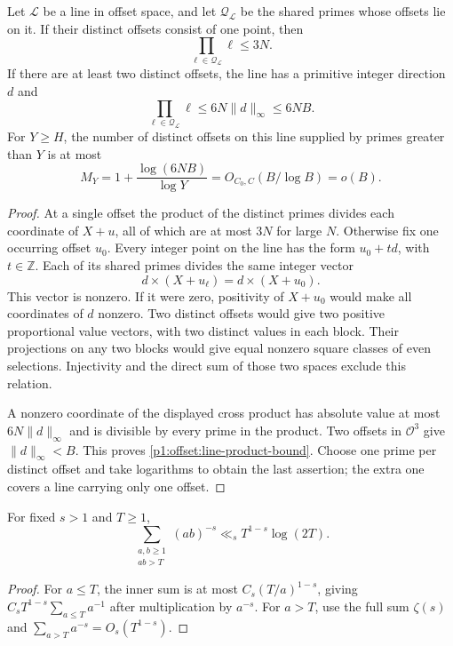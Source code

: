 \begin{lemma}
\label{p1:offset:line-product}
Let $\mathcal L$ be a line in offset space, and let
$\mathcal Q_{\mathcal L}$ be the shared primes whose offsets lie on it.
If their distinct offsets consist of one point, then
\[
 \prod_{\ell\in\mathcal Q_{\mathcal L}}\ell\le3N.
\]
If there are at least two distinct offsets, the line has a primitive
integer direction $d$ and
\begin{equation}
 \prod_{\ell\in\mathcal Q_{\mathcal L}}\ell
       \le6N\|d\|_\infty\le6NB.
 \label{p1:offset:line-product-bound}
\end{equation}
For $Y\ge H$, the number of distinct offsets on this line supplied by
primes greater than $Y$ is at most
\[
 M_Y=1+\frac{\log(6NB)}{\log Y}=O_{C_0,C}(B/\log B)=o(B).
\]
\end{lemma}
\begin{proof}
At a single offset the product of the distinct primes divides each
coordinate of $X+u$, all of which are at most $3N$ for large $N$.
Otherwise fix one occurring offset $u_0$. Every integer point on the
line has the form $u_0+td$, with $t\in\mathbb Z$. Each of its shared
primes divides the same integer vector
\[
 d\times(X+u_\ell)=d\times(X+u_0).
\]
This vector is nonzero. If it were zero, positivity of $X+u_0$ would
make all coordinates of $d$ nonzero. Two distinct offsets would give
two positive proportional value vectors, with two distinct values in
each block. Their projections on any two blocks would give equal
nonzero square classes of even selections. Injectivity and the direct
sum of those two spaces exclude this relation.

A nonzero coordinate of the displayed cross product has absolute value
at most $6N\|d\|_\infty$ and is divisible by every prime in the
product. Two offsets in $\mathcal O^3$ give $\|d\|_\infty<B$.
This proves \eqref{p1:offset:line-product-bound}. Choose one prime per
distinct offset and take logarithms to obtain the last assertion;
the extra one covers a line carrying only one offset.
\end{proof}

\begin{lemma}
\label{p1:offset:integer-tail}
For fixed $s>1$ and $T\ge1$,
\[
 \sum_{\substack{a,b\ge1\\ab>T}}(ab)^{-s}
       \ll_s T^{1-s}\log(2T).
\]
\end{lemma}
\begin{proof}
For $a\le T$, the inner sum is at most
$C_s(T/a)^{1-s}$, giving
$C_sT^{1-s}\sum_{a\le T}a^{-1}$ after multiplication by $a^{-s}$.
For $a>T$, use the full sum $\zeta(s)$ and
$\sum_{a>T}a^{-s}=O_s(T^{1-s})$.
\end{proof}

